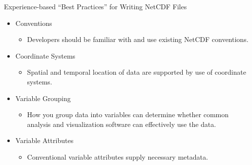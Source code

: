\documentclass[compress,11pt,xcolor=svgnames,aspectratio=169]{beamer}
\begin{document}
\begin{frame}[fragile]{Experience-based ``Best Practices'' for Writing NetCDF Files}

    \begin{itemize}
    \setlength\itemsep{0.4cm}

        \item	Conventions
        \begin{itemize}
          \item Developers should be familiar with and use existing NetCDF conventions.
        \end{itemize}

        \item	Coordinate Systems
        \begin{itemize}
          \item Spatial and temporal location of data are supported by use of coordinate systems.
        \end{itemize}

        \item	Variable Grouping
        \begin{itemize}
          \item How you group data into variables can determine whether common analysis and visualization software can effectively use the data.
        \end{itemize}

        \item	Variable Attributes
        \begin{itemize}
          \item Conventional variable attributes supply necessary metadata.
        \end{itemize}

    \end{itemize}

\nocite{netcdf}

\end{frame}
\end{document}
